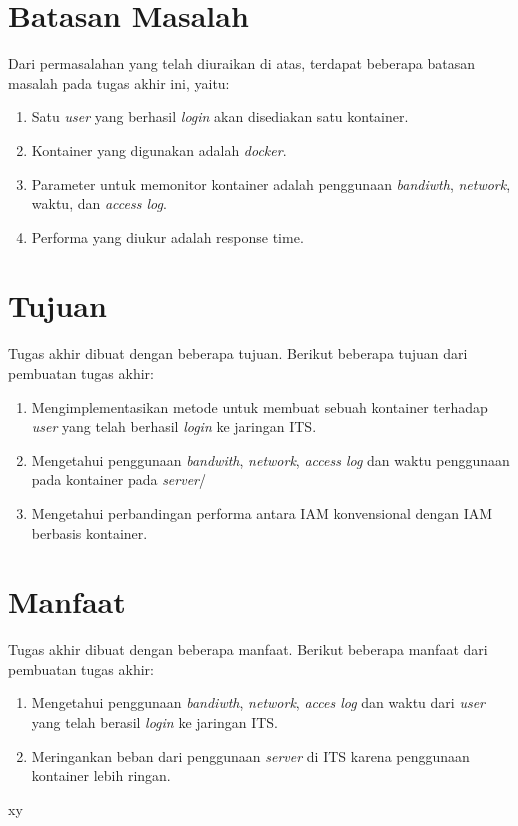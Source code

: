 	\section{Batasan Masalah}
	 Dari permasalahan yang telah diuraikan di atas, terdapat beberapa batasan masalah pada tugas akhir ini, yaitu:
	\begin{enumerate}
     \item Satu \textit{user} yang berhasil \textit{login} akan disediakan satu kontainer.
     \item Kontainer yang digunakan adalah \textit{docker}.
     \item Parameter untuk memonitor kontainer adalah penggunaan \textit{bandiwth}, \textit{network}, waktu, dan \textit{access log}.
     \item Performa yang diukur adalah response time.
	\end{enumerate}
    
   \section{Tujuan}
	Tugas akhir dibuat dengan beberapa tujuan. Berikut beberapa tujuan dari pembuatan tugas akhir:
	\begin{enumerate}
	 \item Mengimplementasikan metode untuk membuat sebuah kontainer terhadap \textit{user} yang telah berhasil \textit{login} ke jaringan ITS.
	 \item Mengetahui penggunaan \textit{bandwith}, \textit{network}, \textit{access log} dan waktu penggunaan pada kontainer pada \textit{server}/
	 \item Mengetahui perbandingan performa antara IAM konvensional dengan IAM berbasis kontainer.
	\end{enumerate}
     
     \section{Manfaat}
	 Tugas akhir dibuat dengan beberapa manfaat. Berikut beberapa manfaat dari pembuatan tugas akhir:
	 \begin{enumerate}
	  \item Mengetahui penggunaan \textit{bandiwth}, \textit{network}, \textit{acces log} dan waktu dari \textit{user} yang telah berasil \textit{login} ke jaringan ITS.
	  \item Meringankan beban dari penggunaan \textit{server} di ITS karena penggunaan kontainer lebih ringan.
	 \end{enumerate}      
     xy
